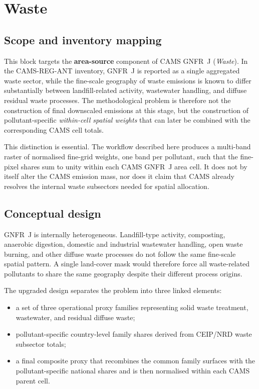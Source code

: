 \section{Waste}
\label{sec:waste}

\subsection{Scope and inventory mapping}

This block targets the \textbf{area-source} component of CAMS GNFR~J
(\emph{Waste}). In the CAMS-REG-ANT inventory, GNFR~J is reported as a
single aggregated waste sector, while the fine-scale geography of waste
emissions is known to differ substantially between landfill-related
activity, wastewater handling, and diffuse residual waste processes.
The methodological problem is therefore not the construction of final
downscaled emissions at this stage, but the construction of
pollutant-specific \emph{within-cell spatial weights} that can later be
combined with the corresponding CAMS cell totals.

This distinction is essential. The workflow described here produces a
multi-band raster of normalised fine-grid weights, one band per
pollutant, such that the fine-pixel shares sum to unity within each
CAMS GNFR~J area cell. It does not by itself alter the CAMS emission
mass, nor does it claim that CAMS already resolves the internal waste
subsectors needed for spatial allocation.

\subsection{Conceptual design}

GNFR~J is internally heterogeneous. Landfill-type activity, composting,
anaerobic digestion, domestic and industrial wastewater handling, open
waste burning, and other diffuse waste processes do not follow the same
fine-scale spatial pattern. A single land-cover mask would therefore
force all waste-related pollutants to share the same geography despite
their different process origins.

The upgraded design separates the problem into three linked elements:
\begin{itemize}
  \item a set of three operational proxy families representing solid
        waste treatment, wastewater, and residual diffuse waste;
  \item pollutant-specific country-level family shares derived from
        CEIP/NRD waste subsector totals;
  \item a final composite proxy that recombines the common family
        surfaces with the pollutant-specific national shares and is then
        normalised within each CAMS parent cell.
\end{itemize}

